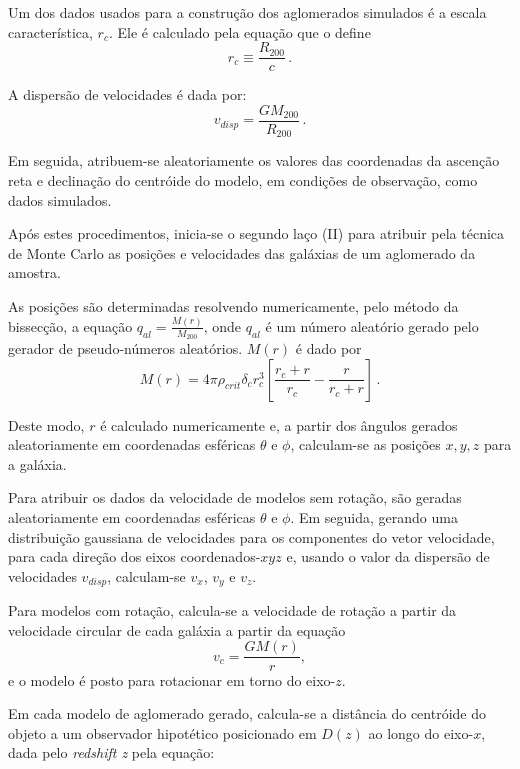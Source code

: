 Um dos dados usados para a construção dos aglomerados simulados é a escala característica, $r_c$. Ele é calculado pela equação que o define
\begin{equation}
r_c \equiv \frac{R_{200}}{c} \, .
\label{rc}
\end{equation}	

A dispersão de velocidades é dada por:
\begin{equation}
v_{disp} = \frac{GM_{200}}{R_{200}} \, .	
\label{vdisp}
\end{equation}
	
\noindent Em seguida, atribuem-se aleatoriamente os valores das coordenadas da ascenção reta e declinação do centróide do modelo, em condições de observação, como dados simulados. 


Após estes procedimentos, inicia-se o segundo laço (II) para atribuir pela técnica de Monte Carlo as posições e velocidades das galáxias de um aglomerado da amostra. 

As posições são determinadas resolvendo numericamente, pelo método da bissecção, a equação $q_{al} = \frac{M(r)}{M_{200}}$, onde $q_{al}$ é um número aleatório gerado pelo gerador de pseudo-números aleatórios. $M(r)$ é dado por
\begin{equation}
M(r)= 4 \pi \rho_{crit} \delta_c r_c^3 \left[ \frac{r_c + r}{r_c} - \frac{r}{r_c+r}  \right] \, .
\label{nfw2}
\end{equation}

Deste modo, $r$ é calculado  numericamente e, a partir dos ângulos gerados aleatoriamente em coordenadas esféricas $\theta$ e $\phi$, calculam-se as posições $x,y,z$ para a galáxia.

Para atribuir os dados da velocidade de modelos sem rotação, são geradas aleatoriamente em coordenadas esféricas $\theta$ e $\phi$. Em seguida, gerando uma distribuição gaussiana de velocidades para os componentes do vetor velocidade, para cada direção dos eixos coordenados-$xyz$ e, usando o valor da dispersão de velocidades $v_{disp}$, calculam-se $v_x$, $v_y$ e $v_z$. 

Para modelos com rotação, calcula-se a velocidade de rotação a partir da velocidade circular de cada galáxia a partir da equação 
\begin{equation}
v_{c} = \frac{G M(r)}{r},
\label{vcirc}
\end{equation}	
e o modelo é posto para rotacionar em torno do eixo-$z$.

Em cada modelo de aglomerado gerado, calcula-se a distância do centróide do objeto a um observador hipotético posicionado em $D(z)$ ao longo do eixo-$x$, dada pelo \textit{redshift z} pela equação: 

